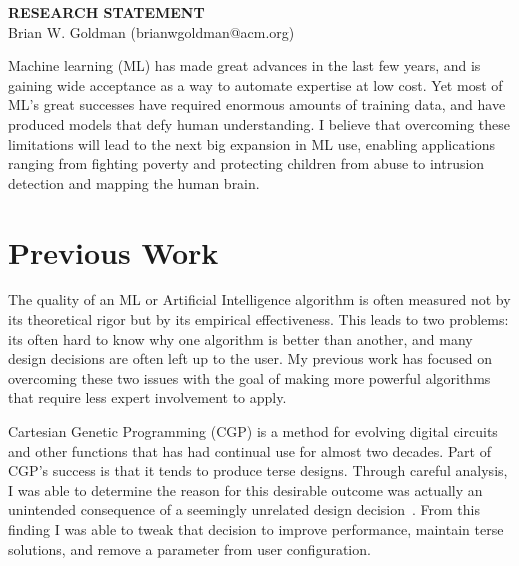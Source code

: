 \documentclass[a4paper, 11pt]{article}
\begin{document}
\thispagestyle{empty}

\pagestyle{fancy}

\begin{center}
{\LARGE \bf RESEARCH STATEMENT}\\
\vspace*{0.1cm}
{\normalsize Brian W. Goldman (brianwgoldman@acm.org)}
\end{center}

\noindent
Machine learning (ML) has made great advances in the last few years, and is gaining wide
acceptance as a way to automate expertise at low cost. Yet most of ML's great successes
have required enormous amounts of training data, and have produced models that
defy human understanding. I believe that overcoming these limitations will lead to the
next big expansion in ML use, enabling applications ranging from fighting poverty and
protecting children from abuse to intrusion detection and mapping the human brain.


\section{Previous Work}
The quality of an ML or Artificial Intelligence algorithm is often measured
not by its theoretical rigor but by its empirical effectiveness. This leads
to two problems: its often hard to know why one algorithm is better than
another, and many design decisions are often left up to the user. My previous
work has focused on overcoming these two issues with the goal of making
more powerful algorithms that require less expert involvement to apply.

Cartesian Genetic Programming (CGP) is a method for evolving digital circuits
and other functions that has had continual use for almost two decades. Part of CGP's
success is that it tends to produce terse designs. Through
careful analysis, I was able to determine the reason for this desirable outcome
was actually an unintended consequence of a seemingly unrelated design
decision~\cite{goldman:2013:ordering,goldman:2015:cgpanalysis}. From this finding
I was able to tweak that decision to improve performance, maintain
terse solutions, and remove a parameter from user configuration.
\end{document}
